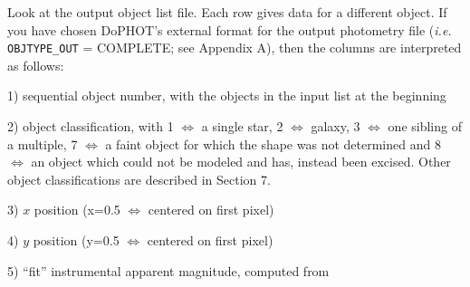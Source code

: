 Look at the output object list file.  Each row gives data
for a different object.  If you have chosen DoPHOT's external format for
the output photometry file ({\it i.e.} {\tt OBJTYPE\_OUT} = COMPLETE; see
Appendix A), then the columns are interpreted as follows:

\item{1)}  sequential object number, with the objects in the input
list at the beginning
\item{2)}  object classification, with 1 $\Leftrightarrow$ a single star, 
2 $\Leftrightarrow$ galaxy,
3 $\Leftrightarrow$ one sibling of a multiple,  7 $\Leftrightarrow$ a 
faint object for
which the shape was not determined and 8 $\Leftrightarrow$ an object which
could not be modeled and has, instead been excised.
Other object classifications are described in Section 7.
\item{3)}  $x$ position (x=0.5 $\Leftrightarrow$ centered on first pixel)
\item{4)}  $y$ position (y=0.5 $\Leftrightarrow$ centered on first pixel)
\item{5)}  ``fit'' instrumental apparent magnitude, computed from
